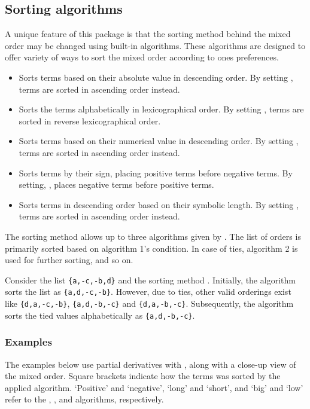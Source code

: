 \subsection{Sorting algorithms} \label{ssec:sort-method}
A unique feature of this package is that the sorting method behind the mixed order may be changed using built-in algorithms. These algorithms are designed to offer variety of ways to sort the mixed order according to ones preferences.
\begin{itemize}[widest = {}, leftmargin =*]
	\item[\val{abs}] Sorts terms based on their absolute value in descending order. By setting , terms are sorted in ascending order instead.
	\item[\val{lexical}] Sorts the terms alphabetically in lexicographical order. By setting , terms are sorted in reverse lexicographical order.
	\item[\val{number}] Sorts terms based on their numerical value in descending order. By setting , terms are sorted in ascending order instead.
	\item[\val{sign}] Sorts terms by their sign, placing positive terms before negative terms. By setting, , places negative terms before positive terms.
	\item[\val{symbol}] Sorts terms in descending order based on their symbolic length. By setting , terms are sorted in ascending order instead.
\end{itemize}

The sorting method allows up to three algorithms given by . The list of orders is primarily sorted based on algorithm 1's condition. In case of ties, algorithm 2 is used for further sorting, and so on.

Consider the list \texttt{\{a,-c,-b,d\}} and the sorting method . Initially, the  algorithm sorts the list as \texttt{\{a,d,-c,-b\}}. However, due to ties, other valid orderings exist like \texttt{\{d,a,-c,-b\}}, \texttt{\{a,d,-b,-c\}} and \texttt{\{d,a,-b,-c\}}. Subsequently, the  algorithm sorts the tied values alphabetically as \texttt{\{a,d,-b,-c\}}.

\subsubsection{Examples}
The examples below use partial derivatives with , along with a close-up view of the mixed order. Square brackets indicate how the terms was sorted by the applied algorithm. `Positive' and `negative', `long' and `short', and `big' and `low' refer to the , , and  algorithms, respectively.

